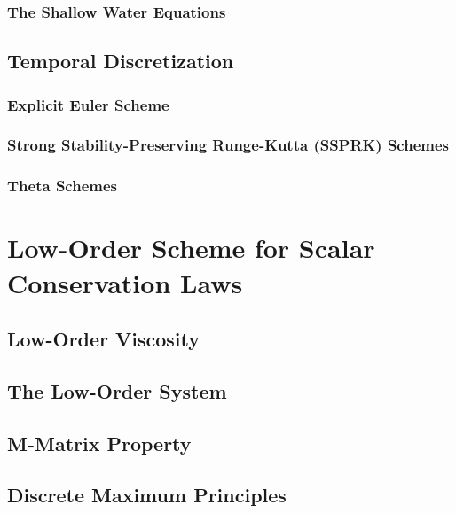   \subsubsection{The Shallow Water Equations}
  
\subsection{Temporal Discretization\label{sec:temporal_discretization}}
  \subsubsection{Explicit Euler Scheme}
    
  \subsubsection{Strong Stability-Preserving Runge-Kutta (SSPRK)
    Schemes\label{sec:ssprk}}
    
  \subsubsection{Theta Schemes\label{sec:theta}}
    
\section{Low-Order Scheme for Scalar Conservation Laws}  
\subsection{Low-Order Viscosity\label{sec:low_order_viscosity}}
  
\subsection{The Low-Order System\label{sec:low_order_system}}
  
\subsection{M-Matrix Property}
  
\subsection{Discrete Maximum Principles\label{sec:DMP}}
  
  
  
